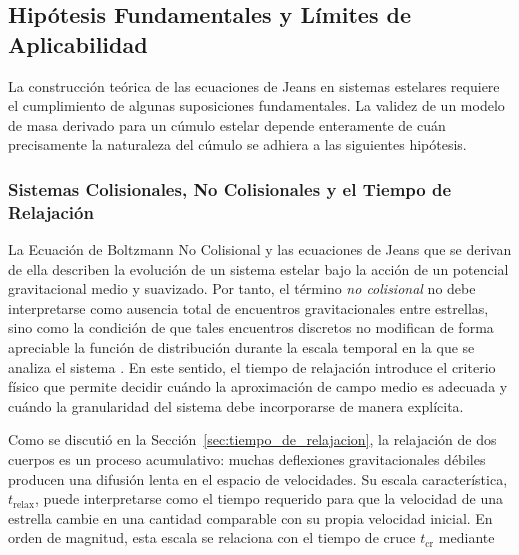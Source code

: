         \subsection{Hipótesis Fundamentales y Límites de Aplicabilidad}
            La construcción teórica de las ecuaciones de Jeans en sistemas 
            estelares requiere el cumplimiento de algunas suposiciones 
            fundamentales.  La validez de un modelo de masa derivado para un 
            cúmulo estelar depende enteramente de cuán precisamente la 
            naturaleza del cúmulo se adhiera a las siguientes hipótesis.

            \subsubsection{Sistemas Colisionales, No Colisionales y el Tiempo 
            de Relajación}
                La Ecuación de Boltzmann No Colisional y las ecuaciones de Jeans 
                que se derivan de ella describen la evolución de un sistema 
                estelar bajo la acción de un potencial gravitacional medio y 
                suavizado. Por tanto, el término \emph{no colisional} no debe 
                interpretarse como ausencia total de encuentros gravitacionales 
                entre estrellas, sino como la condición de que tales encuentros 
                discretos no modifican de forma apreciable la función de 
                distribución durante la escala temporal en la que se analiza el 
                sistema \cite{BinneyTremaine2008,Hamilton2018}. En este sentido, 
                el tiempo de relajación introduce el criterio físico que permite 
                decidir cuándo la aproximación de campo medio es adecuada y 
                cuándo la granularidad del sistema debe incorporarse de manera 
                explícita.

                Como se discutió en la Sección~\ref{sec:tiempo_de_relajacion}, 
                la relajación de dos cuerpos es un proceso acumulativo: muchas 
                deflexiones gravitacionales débiles producen una difusión lenta 
                en el espacio de velocidades. Su escala característica, 
                $t_{\mathrm{relax}}$, puede interpretarse como el tiempo 
                requerido para que la velocidad de una estrella cambie en una 
                cantidad comparable con su propia velocidad inicial. En orden de 
                magnitud, esta escala se relaciona con el tiempo de cruce 
                $t_{\mathrm{cr}}$ mediante

